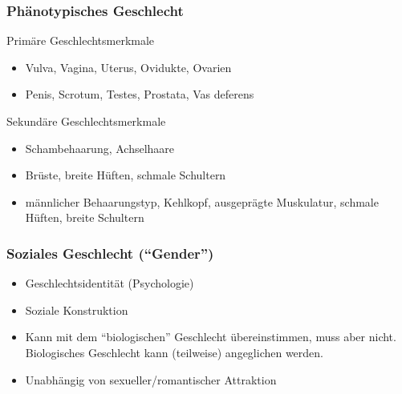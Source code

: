 \documentclass{beamer}
\begin{document}
\begin{frame}
\frametitle{Phänotypisches Geschlecht}

\begin{block}{Primäre Geschlechtsmerkmale}

\begin{itemize}
\item
Vulva, Vagina, Uterus,	Ovidukte, Ovarien
\item
Penis, Scrotum, Testes, Prostata, Vas deferens
\end{itemize}

\end{block}

\begin{block}{Sekundäre Geschlechtsmerkmale}

\begin{itemize}
\item
  Schambehaarung, Achselhaare
\item
  Brüste, breite Hüften, schmale Schultern
\item
  männlicher Behaarungstyp, Kehlkopf, ausgeprägte Muskulatur, schmale Hüften, breite Schultern
\end{itemize}
\end{block}


\end{frame}



\begin{frame}
\frametitle{Soziales Geschlecht (``Gender'')}

\begin{itemize}
\item
Geschlechtsidentität (Psychologie)
\item
Soziale Konstruktion
\item
Kann mit dem ``biologischen'' Geschlecht übereinstimmen, muss aber nicht. Biologisches Geschlecht kann (teilweise) angeglichen werden.
\item
Unabhängig von sexueller/romantischer Attraktion
\end{itemize}


\end{frame}
\end{document}

